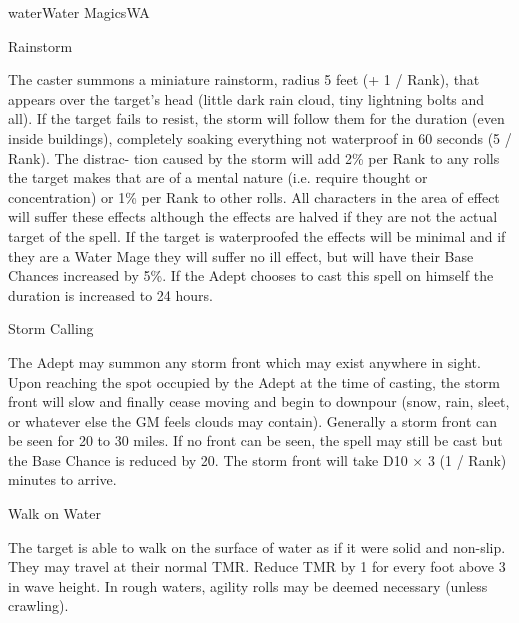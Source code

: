 \begin{College}[1.3]{water}{Water Magics}{WA}
\begin{spell}[S-8]{Rainstorm}
\begin{effects}
The caster summons a miniature rainstorm, radius 5 feet (+ 1 / Rank),
that appears over the target’s head (little dark rain cloud, tiny
lightning bolts and all). If the target fails to resist, the storm
will follow them for the duration (even inside buildings), completely
soaking everything not waterproof in 60 seconds (5 / Rank).  The
distrac- tion caused by the storm will add 2\% per Rank to any rolls
the target makes that are of a mental nature (i.e. require thought or
concentration) or 1\% per Rank to other rolls. All characters in the
area of effect will suffer these effects although the effects are
halved if they are not the actual target of the spell.  If the target
is waterproofed the effects will be minimal and if they are a Water
Mage they will suffer no ill effect, but will have their Base Chances
increased by 5\%. If the Adept chooses to cast this spell on himself
the duration is increased to 24 hours.
\end{effects}
\end{spell}

\begin{spell}[S-9]{Storm Calling}

\begin{effects}
The Adept may summon any storm front which may exist anywhere in
sight. Upon reaching the spot occupied by the Adept at the time of
casting, the storm front will slow and finally cease moving and begin
to downpour (snow, rain, sleet, or whatever else the GM feels clouds
may contain).  Generally a storm front can be seen for 20 to 30
miles. If no front can be seen, the spell may still be cast but the
Base Chance is reduced by 20.  The storm front will take D10 × 3 (1 /
Rank) minutes to arrive.
\end{effects}
\end{spell}

\begin{spell}[S-10]{Walk on Water}
\begin{effects}
The target is able to walk on the surface of water as if it were solid
and non-slip.  They may travel at their normal TMR. Reduce TMR by 1
for every foot above 3 in wave height. In rough waters, agility rolls
may be deemed necessary (unless crawling).
\end{effects}
\end{spell}


\end{College}

